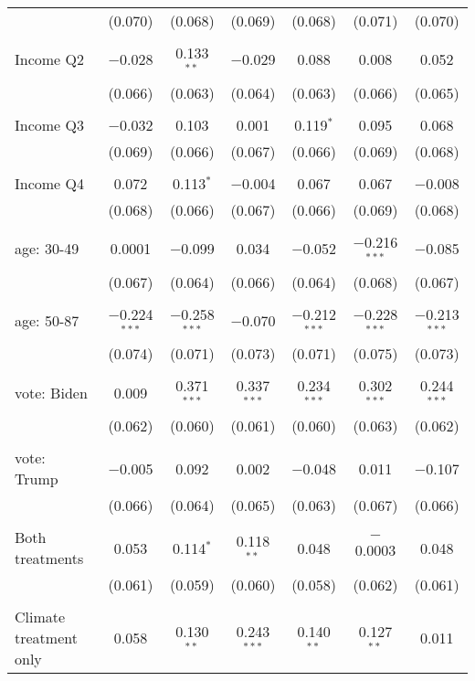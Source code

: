 \begin{tabular}{@{\extracolsep{5pt}}lcccccc}
  & (0.070) & (0.068) & (0.069) & (0.068) & (0.071) & (0.070) \\ 
  & & & & & & \\ 
 Income Q2 & $-$0.028 & 0.133$^{**}$ & $-$0.029 & 0.088 & 0.008 & 0.052 \\ 
  & (0.066) & (0.063) & (0.064) & (0.063) & (0.066) & (0.065) \\ 
  & & & & & & \\ 
 Income Q3 & $-$0.032 & 0.103 & 0.001 & 0.119$^{*}$ & 0.095 & 0.068 \\ 
  & (0.069) & (0.066) & (0.067) & (0.066) & (0.069) & (0.068) \\ 
  & & & & & & \\ 
 Income Q4 & 0.072 & 0.113$^{*}$ & $-$0.004 & 0.067 & 0.067 & $-$0.008 \\ 
  & (0.068) & (0.066) & (0.067) & (0.066) & (0.069) & (0.068) \\ 
  & & & & & & \\ 
 age: 30-49 & 0.0001 & $-$0.099 & 0.034 & $-$0.052 & $-$0.216$^{***}$ & $-$0.085 \\ 
  & (0.067) & (0.064) & (0.066) & (0.064) & (0.068) & (0.067) \\ 
  & & & & & & \\ 
 age: 50-87 & $-$0.224$^{***}$ & $-$0.258$^{***}$ & $-$0.070 & $-$0.212$^{***}$ & $-$0.228$^{***}$ & $-$0.213$^{***}$ \\ 
  & (0.074) & (0.071) & (0.073) & (0.071) & (0.075) & (0.073) \\ 
  & & & & & & \\ 
 vote: Biden & 0.009 & 0.371$^{***}$ & 0.337$^{***}$ & 0.234$^{***}$ & 0.302$^{***}$ & 0.244$^{***}$ \\ 
  & (0.062) & (0.060) & (0.061) & (0.060) & (0.063) & (0.062) \\ 
  & & & & & & \\ 
 vote: Trump & $-$0.005 & 0.092 & 0.002 & $-$0.048 & 0.011 & $-$0.107 \\ 
  & (0.066) & (0.064) & (0.065) & (0.063) & (0.067) & (0.066) \\ 
  & & & & & & \\ 
 Both treatments & 0.053 & 0.114$^{*}$ & 0.118$^{**}$ & 0.048 & $-$0.0003 & 0.048 \\ 
  & (0.061) & (0.059) & (0.060) & (0.058) & (0.062) & (0.061) \\ 
  & & & & & & \\ 
 Climate treatment only & 0.058 & 0.130$^{**}$ & 0.243$^{***}$ & 0.140$^{**}$ & 0.127$^{**}$ & 0.011 \\ 

\end{tabular}
